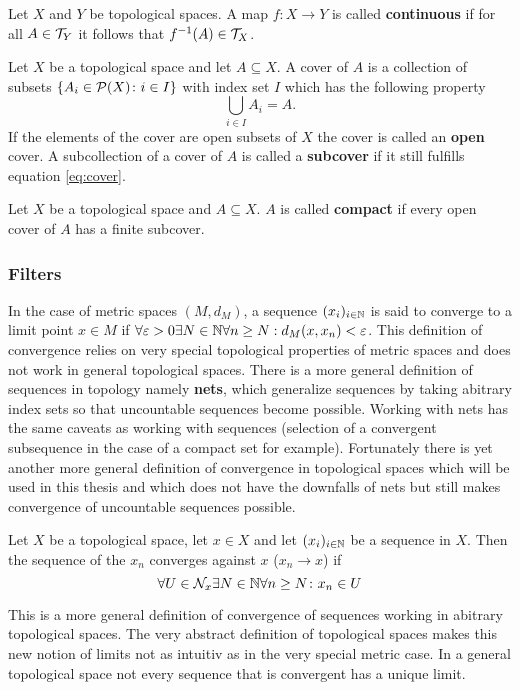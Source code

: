 \begin{defin}
  Let $X$ and $Y$ be topological spaces. A map $f\colon X \to Y$ is called \textbf{continuous} if for all $A \in \T_Y$ it follows that $f^{-1}(A) \in \T_X$.  
\end{defin}

\begin{defin}
  Let $X$ be a topological space and let $A \subseteq X$. A cover of $A$ is a collection of subsets $\left\{A_i \in \P(X)\colon i \in I \right\}$ with index set $I$ which has the following property
  \begin{equation}\label{eq:cover}
    \bigcup\limits_{i\in I}A_i = A.
  \end{equation}
  If the elements of the cover are open subsets of $X$ the cover is called an \textbf{open} cover.
  A subcollection of a cover of $A$ is called a \textbf{subcover} if it still fulfills equation \ref{eq:cover}.
\end{defin}

\begin{defin}
  Let $X$ be a topological space and $A \subseteq X$. $A$ is called \textbf{compact} if every open cover of $A$ has a finite subcover. 
\end{defin}

\subsubsection{Filters}
In the case of metric spaces $(M, d_M)$, a sequence $(x_i)_{i\in \N}$ is said to converge to a limit point $x \in M$ if $\forall \varepsilon>0\exists N \in \N\forall n \geq N: d_M(x, x_n) < \varepsilon$. This definition of convergence relies on very special topological properties of metric spaces and does not work in general topological spaces. There is a more general definition of sequences in topology namely \textbf{nets}, which generalize sequences by taking abitrary index sets so that uncountable sequences become possible. Working with nets has the same caveats as working with sequences (selection of a convergent subsequence in the case of a compact set for example). Fortunately there is yet another more general definition of convergence in topological spaces which will be used in this thesis and which does not have the downfalls of nets but still makes convergence of uncountable sequences possible.

\begin{defin}\label{def:convtop}
  Let $X$ be a topological space, let $x \in X$ and let $(x_i)_{i \in \N}$ be a sequence in $X$. Then the sequence of the $x_n$ converges against $x$ ($x_n \to x$) if
  \begin{equation*}
    \forall U \in \mathcal{N}_x\exists N\in\N\forall n \geq N\colon x_n \in U
  \end{equation*}
\end{defin}
This is a more general definition of convergence of sequences working in abitrary topological spaces. The very abstract definition of topological spaces makes this new notion of limits not as intuitiv as in the very special metric case. In a general topological space not every sequence that is convergent has a unique limit.

